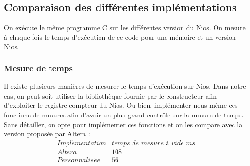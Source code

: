 \documentclass[12pt,a4paper]{article}
\begin{document}

\subsection{Comparaison des différentes implémentations}
On exécute le même programme C sur les différentes version du Nios. On mesure à chaque fois le temps d'exécution de ce code pour une mémoire et un version Nios.

\subsubsection{Mesure de temps}
Il existe plusieurs manières de mesurer le temps d'exécution sur Nios. Dans notre cas, on peut soit utiliser la bibliothèque fournie par le constructeur afin d'exploiter le registre compteur du Nios. Ou bien, implémenter nous-même ces fonctions de mesures afin d'avoir un plus grand contrôle sur la mesure de temps. Sans détailler, on opte pour implémenter ces fonctions et on les compare avec la version proposée par Altera :
$$
\begin{array}{cc}
	Impl\acute{e}mentation & \textit{temps de mesure à  vide ms} \\ 
	Altera & 108 \\ 
	Personnalis\acute{e}e & 56 
\end{array} 
$$
\end{document}
